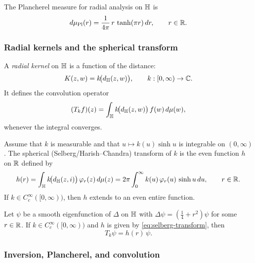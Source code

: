 The Plancherel measure for radial analysis on $\mathbb{H}$ is
\begin{equation}\label{eq:plancherel-density}
d\mu_{\mathrm{Pl}}(r)=\frac{1}{4\pi}\,r\,\tanh(\pi r)\,dr,
\qquad r\in\mathbb{R} .
\end{equation}

\subsubsection{Radial kernels and the spherical transform}\label{subsec:radial-kernels}

A \emph{radial kernel} on $\mathbb{H}$ is a function of the distance:
\[
K(z,w)=k\!\bigl(d_{\mathbb{H}}(z,w)\bigr),
\qquad
k:[0,\infty)\to\mathbb{C}.
\]
It defines the convolution operator
\begin{equation}\label{eq:radial-operator}
(T_{k}f)(z)=\int_{\mathbb{H}}k\!\bigl(d_{\mathbb{H}}(z,w)\bigr)\,f(w)\,d\mu(w),
\end{equation}
whenever the integral converges.

\begin{definition}\label{def:spherical-transform}
Assume that $k$ is measurable and that $u\mapsto k(u)\sinh u$ is integrable on $(0,\infty)$.
The spherical (Selberg/Harish--Chandra) transform of $k$ is the even function $h$ on $\mathbb{R}$ defined by
\begin{equation}\label{eq:selberg-transform}
h(r)
=
\int_{\mathbb{H}}k\!\bigl(d_{\mathbb{H}}(z,i)\bigr)\,\varphi_{r}(z)\,d\mu(z)
=
2\pi\int_{0}^{\infty}k(u)\,\varphi_{r}(u)\,\sinh u\,du,
\qquad r\in\mathbb{R}.
\end{equation}
If $k\in C_c^\infty([0,\infty))$, then $h$ extends to an even entire function.
\end{definition}

\begin{proposition}\label{prop:multiplier-property}
Let $\psi$ be a smooth eigenfunction of $\Delta$ on $\mathbb{H}$ with
$\Delta\psi=(\frac14+r^{2})\psi$ for some $r\in\mathbb{R}$.
If $k\in C_c^\infty([0,\infty))$ and $h$ is given by \eqref{eq:selberg-transform}, then
\begin{equation}\label{eq:multiplier}
T_k\psi=h(r)\,\psi.
\end{equation}
\end{proposition}

\subsubsection{Inversion, Plancherel, and convolution}\label{subsec:inversion-plancherel}

